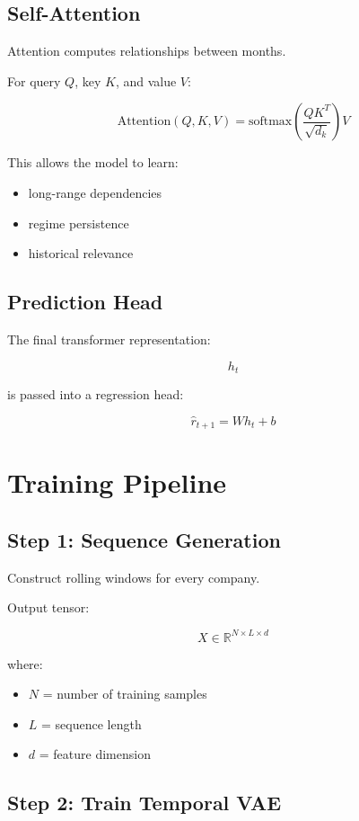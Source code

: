 \documentclass[11pt]{article}
\begin{document}
\subsection{Self-Attention}

Attention computes relationships between months.

For query $Q$, key $K$, and value $V$:

\[
\text{Attention}(Q,K,V)
=
\text{softmax}
\left(
\frac{QK^T}{\sqrt{d_k}}
\right)V
\]

This allows the model to learn:
\begin{itemize}
    \item long-range dependencies
    \item regime persistence
    \item historical relevance
\end{itemize}

\subsection{Prediction Head}

The final transformer representation:

\[
h_t
\]

is passed into a regression head:

\[
\hat r_{t+1}
=
W h_t + b
\]

\section{Training Pipeline}

\subsection{Step 1: Sequence Generation}

Construct rolling windows for every company.

Output tensor:

\[
X \in \mathbb{R}^{N \times L \times d}
\]

where:
\begin{itemize}
    \item $N$ = number of training samples
    \item $L$ = sequence length
    \item $d$ = feature dimension
\end{itemize}

\subsection{Step 2: Train Temporal VAE}
\end{document}

